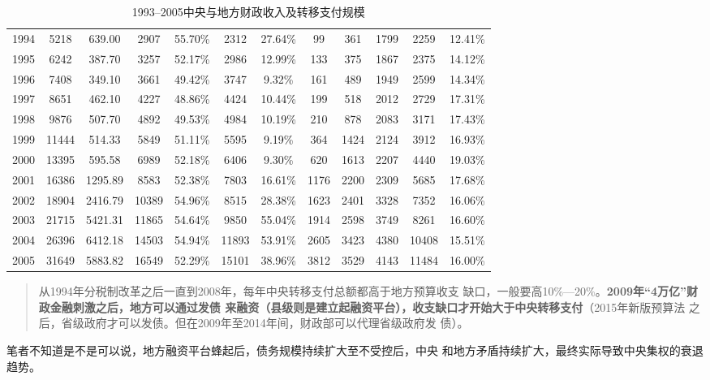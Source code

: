 \begin{table}[htbp]
{\begin{tabular}{@{}cccccccccccc@{}}
1994 & 5218  & 639.00  & 2907  & 55.70\% & 2312  & 27.64\% & 99   & 361  & 1799 & 2259  & 12.41\% \\
1995 & 6242  & 387.70  & 3257  & 52.17\% & 2986  & 12.99\% & 133  & 375  & 1867 & 2375  & 14.12\% \\
1996 & 7408  & 349.10  & 3661  & 49.42\% & 3747  & 9.32\%  & 161  & 489  & 1949 & 2599  & 14.34\% \\
1997 & 8651  & 462.10  & 4227  & 48.86\% & 4424  & 10.44\% & 199  & 518  & 2012 & 2729  & 17.31\% \\
1998 & 9876  & 507.70  & 4892  & 49.53\% & 4984  & 10.19\% & 210  & 878  & 2083 & 3171  & 17.43\% \\
1999 & 11444 & 514.33  & 5849  & 51.11\% & 5595  & 9.19\%  & 364  & 1424 & 2124 & 3912  & 16.93\% \\
2000 & 13395 & 595.58  & 6989  & 52.18\% & 6406  & 9.30\%  & 620  & 1613 & 2207 & 4440  & 19.03\% \\
2001 & 16386 & 1295.89 & 8583  & 52.38\% & 7803  & 16.61\% & 1176 & 2200 & 2309 & 5685  & 17.68\% \\
2002 & 18904 & 2416.79 & 10389 & 54.96\% & 8515  & 28.38\% & 1623 & 2401 & 3328 & 7352  & 16.06\% \\
2003 & 21715 & 5421.31 & 11865 & 54.64\% & 9850  & 55.04\% & 1914 & 2598 & 3749 & 8261  & 16.60\% \\
2004 & 26396 & 6412.18 & 14503 & 54.94\% & 11893 & 53.91\% & 2605 & 3423 & 4380 & 10408 & 15.51\% \\
2005 & 31649 & 5883.82 & 16549 & 52.29\% & 15101 & 38.96\% & 3812 & 3529 & 4143 & 11484 & 16.00\% \\ \bottomrule
\end{tabular}%
}
\StopDefiningTabulars
\caption{1993--2005中央与地方财政收入及转移支付规模}
\label{tab:zhuanyi}
\end{table}


\begin{quotation}
  从1994年分税制改革之后一直到2008年，每年中央转移支付总额都高于地方预算收支
  缺口，一般要高10\%—20\%。\textbf{2009年“4万亿”财政金融刺激之后，地方可以通过发债
  来融资（县级则是建立起融资平台），收支缺口才开始大于中央转移支付}（2015年新版预算法
  之后，省级政府才可以发债。但在2009年至2014年间，财政部可以代理省级政府发
  债）。\cite{zhishenshinei}
\end{quotation}

笔者不知道是不是可以说，地方融资平台蜂起后，债务规模持续扩大至不受控后，中央
和地方矛盾持续扩大，最终实际导致中央集权的衰退趋势。

